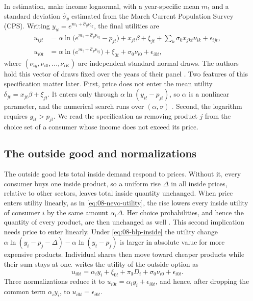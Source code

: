 In estimation, \citet[eqs.~(6.14a), (6.14b)]{BerryLevinsohnPakes1995} make income lognormal, with a
year-specific mean $m_t$ and a standard deviation $\hat\sigma_y$ estimated from the March Current Population
Survey (CPS). Writing $y_{it} = e^{m_t + \hat\sigma_y\nu_{iy}}$, the final utilities are
\begin{align}
  u_{ijt} &= \alpha\ln\bigl(e^{m_t + \hat\sigma_y\nu_{iy}} - p_{jt}\bigr) + x_{jt}\beta + \xi_{jt}
            + \sum_k \sigma_k x_{jkt}\nu_{ik} + \epsilon_{ijt}, \label{eq:08-blp-final-inside}\\
  u_{i0t} &= \alpha\ln\bigl(e^{m_t + \hat\sigma_y\nu_{iy}}\bigr) + \xi_{0t} + \sigma_0\nu_{i0}
            + \epsilon_{i0t}, \label{eq:08-blp-final-outside}
\end{align}
where $(\nu_{iy}, \nu_{i0}, \dots, \nu_{iK})$ are independent standard normal draws. The authors hold this
vector of draws fixed over the years of their panel \citep[p.~868]{BerryLevinsohnPakes1995}. Two features of
this specification matter later. First, price does not enter the mean utility $\delta_{jt} = x_{jt}\beta +
\xi_{jt}$. It enters only through $\alpha\ln(y_{it} - p_{jt})$, so $\alpha$ is a nonlinear parameter, and the
numerical search runs over $(\alpha, \sigma)$ \citep[Section~6.5]{BerryLevinsohnPakes1995}. Second, the
logarithm requires $y_{it} > p_{jt}$. We read the specification as removing product $j$ from the choice set of
a consumer whose income does not exceed its price.

\subsection{The outside good and normalizations}\label{sec:08-normalization}

The outside good lets total inside demand respond to prices. Without it, every consumer buys one inside
product, so a uniform rise $\Delta$ in all inside prices, relative to other sectors, leaves total inside
quantity unchanged. When price enters utility linearly, as in \eqref{eq:08-nevo-utility}, the rise lowers
every inside utility of consumer $i$ by the same amount $\alpha_i\Delta$. Her choice probabilities, and hence
the quantity of every product, are then unchanged as well \citep[p.~520]{Nevo2000a}. This second implication
needs price to enter linearly. Under \eqref{eq:08-blp-inside} the utility change $\alpha\ln(y_i - p_j -
\Delta) - \alpha\ln(y_i - p_j)$ is larger in absolute value for more expensive products. Individual shares then
move toward cheaper products while their sum stays at one. \citet[p.~520]{Nevo2000a} writes the utility of the
outside option as
\begin{equation}\label{eq:08-outside-utility}
  u_{i0t} = \alpha_i y_i + \xi_{0t} + \pi_0 D_i + \sigma_0 \nu_{i0} + \epsilon_{i0t}.
\end{equation}
Three normalizations reduce it to $u_{i0t} = \alpha_i y_i + \epsilon_{i0t}$, and hence, after dropping the
common term $\alpha_i y_i$, to $u_{i0t} = \epsilon_{i0t}$.

